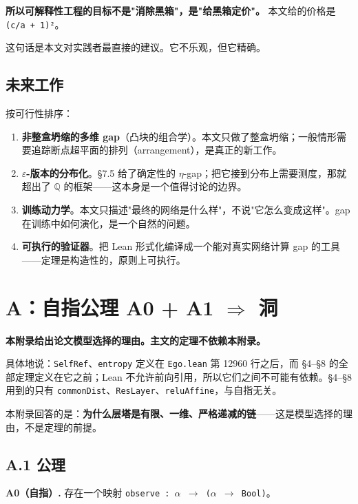 \documentclass[11pt,a4paper]{ctexart}
\begin{document}
\textbf{所以可解释性工程的目标不是"消除黑箱"，是"给黑箱定价"。} 本文给的价格是 \texttt{(c/a + 1)²}。

这句话是本文对实践者最直接的建议。它不乐观，但它精确。

\subsection{未来工作}

按可行性排序：

\begin{enumerate}
\item \textbf{非整盒坍缩的多维 gap}（凸块的组合学）。本文只做了整盒坍缩；一般情形需要追踪断点超平面的排列（arrangement），是真正的新工作。
\item \textbf{\ensuremath{\varepsilon}-版本的分布化}。§7.5 给了确定性的 \ensuremath{\eta}-gap；把它接到分布上需要测度，那就超出了 \ensuremath{\mathbb{Q}} 的框架——这本身是一个值得讨论的边界。
\item \textbf{训练动力学}。本文只描述"最终的网络是什么样"，不说"它怎么变成这样"。gap 在训练中如何演化，是一个自然的问题。
\item \textbf{可执行的验证器}。把 Lean 形式化编译成一个能对真实网络计算 gap 的工具——定理是构造性的，原则上可执行。
\end{enumerate}

\bigskip

\appendix

\section{A：自指公理 A0 + A1 \ensuremath{\Longrightarrow} 洞}

\textbf{本附录给出论文模型选择的理由。主文的定理不依赖本附录。}

具体地说：\texttt{SelfRef}、\texttt{entropy} 定义在 \texttt{Ego.lean} 第 12960 行之后，而 §4–§8 的全部定理定义在它之前；Lean 不允许前向引用，所以它们之间不可能有依赖。§4–§8 用到的只有 \texttt{commonDist}、\texttt{ResLayer}、\texttt{reluAffine}，与自指无关。

本附录回答的是：\textbf{为什么层塔是有限、一维、严格递减的链}——这是模型选择的理由，不是定理的前提。

\subsection{A.1 公理}

\textbf{A0（自指）.} 存在一个映射 \texttt{observe : \ensuremath{\alpha} \ensuremath{\to} (\ensuremath{\alpha} \ensuremath{\to} Bool)}。
\end{document}

